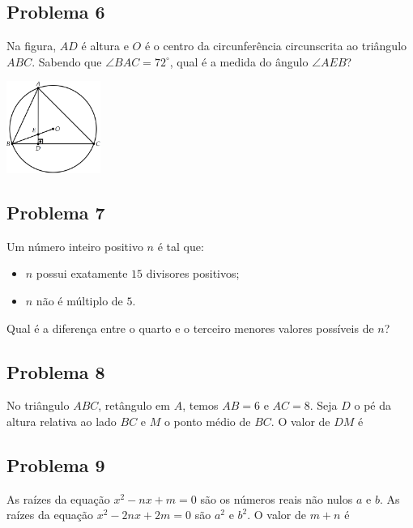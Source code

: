 \documentclass[12pt]{article}
\begin{document}
    \clearpage

    \subsection{Problema 6}
\begin{tcolorbox}[statementbox]
Na figura, $AD$ é altura e $O$ é o centro da circunferência circunscrita ao triângulo $ABC$. Sabendo que $\angle BAC = 72^\circ$, qual é a medida do ângulo $\angle AEB$?

\begin{center}
  \includegraphics[width=0.23\textwidth]{second.png}
\end{center}
\end{tcolorbox}

\clearpage

\subsection{Problema 7}
\begin{tcolorbox}[statementbox]
Um número inteiro positivo $n$ é tal que:
\begin{itemize}[nosep]
  \item $n$ possui exatamente $15$ divisores positivos;
  \item $n$ não é múltiplo de $5$.
\end{itemize}
Qual é a diferença entre o quarto e o terceiro menores valores possíveis de $n$?
\end{tcolorbox}

\clearpage

\subsection{Problema 8}
\begin{tcolorbox}[statementbox]
No triângulo $ABC$, retângulo em $A$, temos $AB=6$ e $AC=8$. Seja $D$ o pé da altura relativa ao lado $BC$ e $M$ o ponto médio
de $BC$. O valor de $DM$ é
\end{tcolorbox}

\clearpage

\subsection{Problema 9}
\begin{tcolorbox}[statementbox]
As raízes da equação $x^{2}-nx+m=0$ são os números reais não nulos $a$ e $b$. As raízes da equação $x^{2}-2nx+2m=0$ são 
$a^{2}$ e $b^{2}$. O valor de $m+n$ é
\end{tcolorbox}
\end{document}
